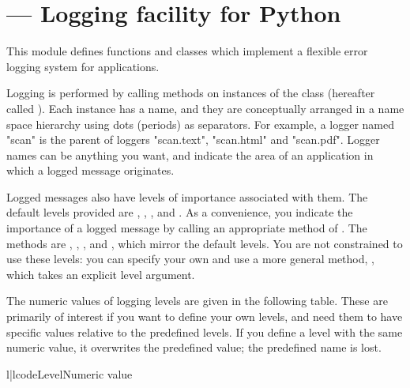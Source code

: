 \section{ ---
         Logging facility for Python}






This module defines functions and classes which implement a flexible
error logging system for applications.

Logging is performed by calling methods on instances of the
 class (hereafter called ). Each instance has a
name, and they are conceptually arranged in a name space hierarchy
using dots (periods) as separators. For example, a logger named
"scan" is the parent of loggers "scan.text", "scan.html" and "scan.pdf".
Logger names can be anything you want, and indicate the area of an
application in which a logged message originates.

Logged messages also have levels of importance associated with them.
The default levels provided are , ,
,  and . As a
convenience, you indicate the importance of a logged message by calling
an appropriate method of . The methods are
, , ,  and
, which mirror the default levels. You are not
constrained to use these levels: you can specify your own and use a
more general  method, , which takes an
explicit level argument.

The numeric values of logging levels are given in the following table. These
are primarily of interest if you want to define your own levels, and need
them to have specific values relative to the predefined levels. If you
define a level with the same numeric value, it overwrites the predefined
value; the predefined name is lost.

\begin{tableii}{l|l}{code}{Level}{Numeric value}
\end{tableii}


